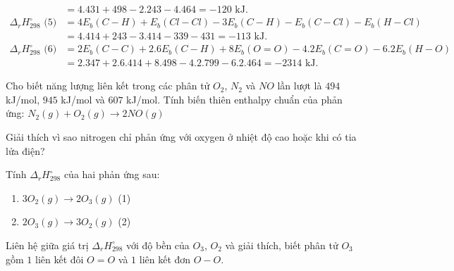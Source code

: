 \documentclass[Main.tex]{subfiles}
\begin{document}
\begin{bt}
{\begin{align*}
			&= 4.431 + 498 - 2.243 - 4.464 = -120 \text{ kJ}. \\
			\Delta_r H_{298}^\circ \text{ (5)}	&= 4E_b(C - H) + E_b(Cl - Cl) - 3E_b(C - H) - E_b(C - Cl) - E_b(H - Cl) \\
			&= 4.414 + 243 - 3.414 - 339 - 431 = -113 \text{ kJ}. \\
			\Delta_r H_{298}^\circ \text{ (6)}	&= 2E_b(C - C) + 2.6E_b(C - H) + 8E_b(O = O) - 4.2E_b(C = O) - 6.2E_b(H - O) \\
			&= 2.347 + 2.6.414 + 8.498 - 4.2.799 - 6.2.464 = -2314 \text{ kJ}.
		\end{align*}
	}
\end{bt}
\begin{bt}
	Cho biết năng lượng liên kết trong các phân tử $O_2$, $N_2$ và $NO$ lần lượt là $494$ kJ/mol, $945$ kJ/mol và $607$ kJ/mol. Tính biến thiên enthalpy chuẩn của phản ứng:
	$N_2(g) + O_2(g) \longrightarrow 2NO(g)$
	
	Giải thích vì sao nitrogen chỉ phản ứng với oxygen ở nhiệt độ cao hoặc khi có tia lửa điện?
\end{bt}
\begin{bt}
	Tính $\Delta_r H_{298}^\circ$ của hai phản ứng sau:
	\begin{enumerate}
		\item $3O_2(g) \longrightarrow 2O_3(g)$ (1)
		\item $2O_3(g) \longrightarrow 3O_2(g)$ (2)
	\end{enumerate}
	Liên hệ giữa giá trị $\Delta_r H_{298}^\circ$ với độ bền của $O_3$, $O_2$ và giải thích, biết phân tử $O_3$ gồm $1$ liên kết đôi $O=O$ và $1$ liên kết đơn $O-O$.
\end{bt}
\end{document}
